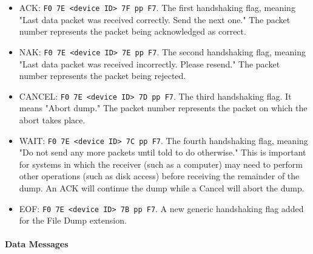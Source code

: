    \begin{itemize}
      \item ACK:
         \texttt{F0 7E <device ID> 7F pp F7}.
         The first handshaking flag, meaning "Last data packet
         was received correctly. Send the next one."
         The packet number represents the packet being acknowledged as correct.
      \item NAK:
         \texttt{F0 7E <device ID> 7E pp F7}.
         The second handshaking flag, meaning "Last data packet was received
         incorrectly. Please resend."
         The packet number represents the packet being rejected.
      \item CANCEL:
         \texttt{F0 7E <device ID> 7D pp F7}.
         The third handshaking flag. It means "Abort dump."
         The packet number represents the packet on which the
         abort takes place.
      \item WAIT:
         \texttt{F0 7E <device ID> 7C pp F7}.
         The fourth handshaking flag, meaning "Do not send any more packets
         until told to do otherwise." This is important for systems in
         which the receiver (such as a computer) may need to
         perform other operations (such as disk access)
         before receiving the remainder of the dump. An ACK will
         continue the dump while a Cancel will abort the dump.
      \item EOF:
         \texttt{F0 7E <device ID> 7B pp F7}.
         A new generic handshaking flag added for the File Dump
         extension.
   \end{itemize}

\paragraph{Data Messages}
\label{paragraph:midi_seq66_data_message}

